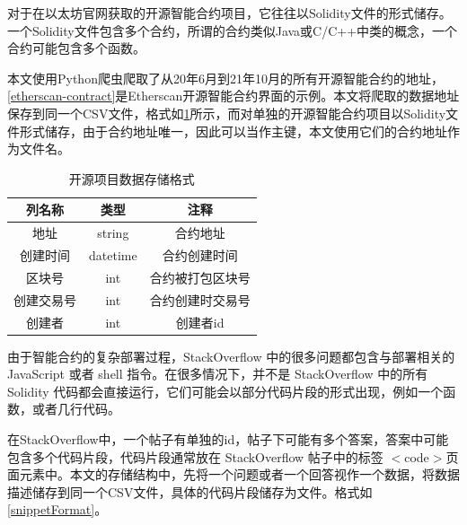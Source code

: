 对于在以太坊官网获取的开源智能合约项目，它往往以Solidity文件的形式储存。
一个Solidity文件包含多个合约，所谓的合约类似Java或C/C++中类的概念，一个合约可能包含多个函数。

本文使用Python爬虫爬取了从20年6月到21年10月的所有开源智能合约的地址，\ref{etherscan-contract}是Etherscan开源智能合约界面的示例。本文将爬取的数据地址保存到同一个CSV文件，格式如\ref{createFormat}所示，而对单独的开源智能合约项目以Solidity文件形式储存，由于合约地址唯一，因此可以当作主键，本文使用它们的合约地址作为文件名。

\begin{table}[htbp]
\centering
\begin{tabular}{|c|c|c|}
\hline
列名称                         & 类型                  & 注释       \\ \hline
地址                          & string                 & 合约地址     \\ \hline
创建时间                        & datetime & 合约创建时间   \\ \hline
区块号                         & int                  & 合约被打包区块号 \\ \hline
创建交易号 & int                & 合约创建时交易号 \\ \hline
创建者   & int                  & 创建者id    \\ \hline
\end{tabular}
\caption{开源项目数据存储格式}
\label{createFormat}
\end{table}



由于智能合约的复杂部署过程，StackOverflow 中的很多问题都包含与部署相关的 JavaScript 或者 shell 指令。在很多情况下，并不是 StackOverflow 中的所有 Solidity 代码都会直接运行，它们可能会以部分代码片段的形式出现，例如一个函数，或者几行代码。

在StackOverflow中，一个帖子有单独的id，帖子下可能有多个答案，答案中可能包含多个代码片段，代码片段通常放在 StackOverflow 帖子中的标签 $<$code$>$页面元素中。本文的存储结构中，先将一个问题或者一个回答视作一个数据，将数据描述储存到同一个CSV文件，具体的代码片段储存为文件。格式如\ref{snippetFormat}。

